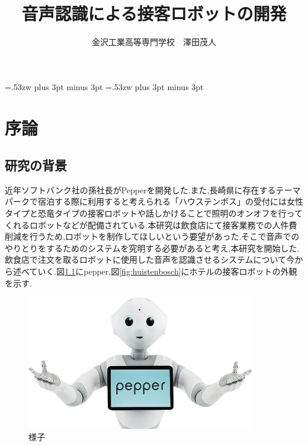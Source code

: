 \documentclass[12pt,oneside]{sotsuken_paper}
\begin{document}
\title{音声認識による接客ロボットの開発}

\author{金沢工業高等専門学校　澤田茂人}

\setlength{\baselineskip}{9truemm}

\kanJiskip=.53zw plus 3pt minus 3pt
\xkanJiskip=.53zw plus 3pt minus 3pt

\tableofcontents


\chapter{序論}
\section{研究の背景}
近年ソフトバンク社の孫社長がPepperを開発した.また,長崎県に存在するテーマパークで宿泊する際に利用すると考えられる「ハウステンボス」の受付には女性タイプと恐竜タイプの接客ロボットや話しかけることで照明のオンオフを行ってくれるロボットなどが配備されている.本研究は飲食店にて接客業務での人件費削減を行うため,ロボットを制作してほしいという要望があった.そこで音声でのやりとりをするためのシステムを究明する必要があると考え,本研究を開始した.飲食店で注文を取るロボットに使用した音声を認識させるシステムについて今から述べていく.図\ref{fig:hospitality-robot}にpepper,図\ref{fig:huistenbosch}にホテルの接客ロボットの外観を示す.


\begin{figure}[htbp]
\begin{center}
\includegraphics[width=100mm]{img/pepper.png}
\caption{様子}
\label{fig:hospitality-robot}
\end{center}
\end{figure}
\end{document}
